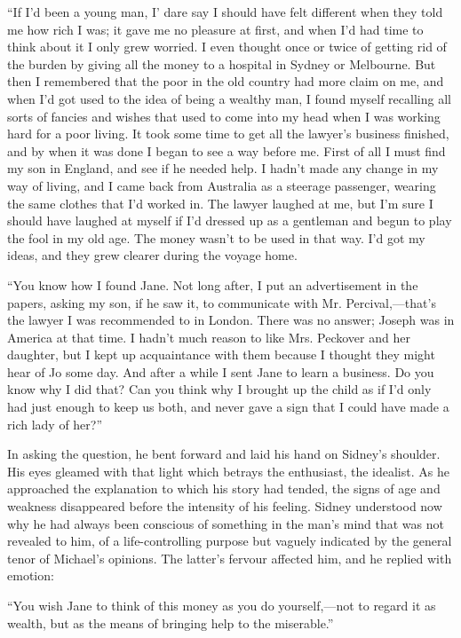 ``If I'd been a young man, I' dare say I should have felt different when
they told me how rich I was; it gave me no pleasure at first, and when
I'd had time to think about it I only grew worried. I even thought once
or twice of getting rid of the burden by giving all the money to a
hospital in Sydney or {\protect\hypertarget{139}{}{}}Melbourne. But then
I remembered that the poor in the old country had more claim on me, and
when I'd got used to the idea of being a wealthy man, I found myself
recalling all sorts of fancies and wishes that used to come into my head
when I was working hard for a poor living. It took some time to get all
the lawyer's business finished, and by when it was done I began to see a
way before me. First of all I must find my son in England, and see if he
needed help. I hadn't made any change in my way of living, and I came
back from Australia as a steerage passenger, wearing the same clothes
that I'd worked in. The lawyer laughed at me, but I'm sure I should have
laughed at myself if I'd dressed up as a gentleman and begun to play the
fool in my old age. The money wasn't to be used in that way. I'd got my
ideas, and they grew clearer during the voyage home.

``You know how I found Jane. Not long after, I put an advertisement in
the papers, asking my son, if he saw it, to communicate with Mr.
Percival,---that's the lawyer I was
{\protect\hypertarget{140}{}{}}recommended to in London. There was no
answer; Joseph was in America at that time. I hadn't much reason to like
Mrs. Peckover and her daughter, but I kept up acquaintance with them
because I thought they might hear of Jo some day. And after a while I
sent Jane to learn a business. Do you know why I did that? Can you think
why I brought up the child as if I'd only had just enough to keep us
both, and never gave a sign that I could have made a rich lady of her?''

In asking the question, he bent forward and laid his hand on Sidney's
shoulder. His eyes gleamed with that light which betrays the enthusiast,
the idealist. As he approached the explanation to which his story had
tended, the signs of age and weakness disappeared before the intensity
of his feeling. Sidney understood now why he had always been conscious
of something in the man's mind that was not revealed to him, of a
life-controlling purpose but vaguely indicated by the general tenor of
Michael's opinions. The latter's fervour affected him, and he replied
with emotion:

{\protect\hypertarget{141}{}{}}``You wish Jane to think of this money as
you do yourself,---not to regard it as wealth, but as the means of
bringing help to the miserable.''

